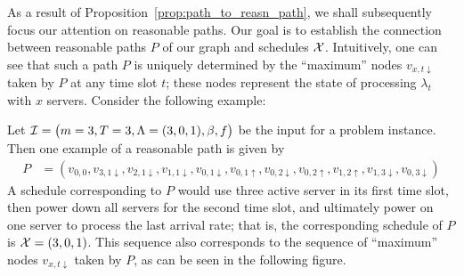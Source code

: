 As a result of Proposition~\ref{prop:path_to_reasn_path}, we shall subsequently focus our attention on reasonable paths. Our goal is to establish the connection between reasonable paths $P$ of our graph and schedules $\mathcal{X}$. Intuitively, one can see that such a path $P$ is uniquely determined by the ``maximum'' nodes $v_{x,t\downarrow}$ taken by $P$ at any time slot $t$; these nodes represent the state of processing $\lambda_t$ with $x$ servers. Consider the following example:
\begin{exmpl}
Let $\mathcal{I}=\bigl(m=3,T=3,\Lambda=(3,0,1),\beta,f\bigr)$ be the input for a problem instance. Then one example of a reasonable path is given by
\begin{align*}
	P&=(v_{0,0},v_{3,1\downarrow},v_{2,1\downarrow},v_{1,1\downarrow},v_{0,1\downarrow},v_{0,1\uparrow},v_{0,2\downarrow},v_{0,2\uparrow},v_{1,2\uparrow},v_{1,3\downarrow},v_{0,3\downarrow})
\end{align*}
A schedule corresponding to $P$ would use three active server in its first time slot, then power down all servers for the second time slot, and ultimately power on one server to process the last arrival rate; that is, the corresponding schedule of $P$ is $\mathcal{X}=(3,0,1)$. This sequence also corresponds to the sequence of ``maximum'' nodes $v_{x,t\downarrow}$ taken by $P$, as can be seen in the following figure.
\begin{figure}[H]
\centering
{}
\end{figure}
\end{exmpl}

